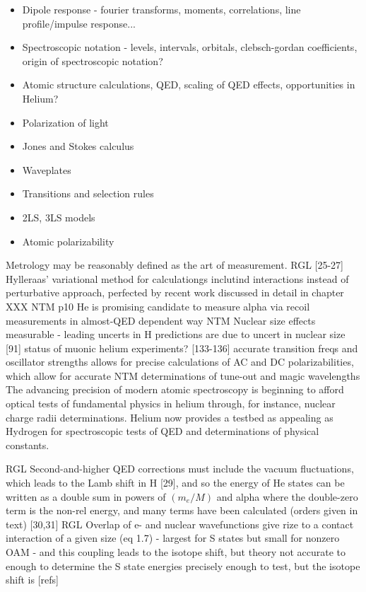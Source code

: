 
\begin{itemize}
	\item Dipole response - fourier transforms, moments, correlations, line profile/impulse response...
	\item Spectroscopic notation - levels, intervals, orbitals, clebsch-gordan coefficients, origin of spectroscopic notation?
	\item Atomic structure calculations, QED, scaling of QED effects, opportunities in Helium?
	\item Polarization of light
	\item Jones and Stokes calculus
	\item Waveplates
	\item Transitions and selection rules
	\item 2LS, 3LS models
	\item Atomic polarizability
\end{itemize}
Metrology may be reasonably defined as the art of measurement.
RGL [25-27] Hylleraas' variational method for calculationgs inclutind interactions instead of perturbative approach, perfected by recent work discussed in detail in chapter XXX
NTM p10 He is promising candidate to measure alpha via recoil measurements in almost-QED dependent way 
NTM Nuclear size effects measurable - leading uncerts in H predictions are due to uncert in nuclear size [91] 
		status of muonic helium experiments?
[133-136] accurate transition freqs and oscillator strengths allows for precise calculations of AC and DC polarizabilities, which allow for accurate NTM determinations of tune-out and magic wavelengths 
The advancing precision of modern atomic spectroscopy is beginning to afford optical tests of fundamental physics in helium through, for instance, nuclear charge radii determinations.
	Helium now provides a testbed as appealing as Hydrogen for spectroscopic tests of QED and determinations of physical constants.
	
			RGL Second-and-higher QED corrections must include the vacuum fluctuations, which leads to the Lamb shift in H [29], and so the energy of He states can be written as a double sum in powers of $(m_e/M)$ and alpha where the double-zero term is the non-rel energy, and many terms have been calculated (orders given in text) [30,31]  
			RGL Overlap of e- and nuclear wavefunctions give rize to a contact interaction of a given size (eq 1.7) - largest for S states but small for nonzero OAM - and this coupling leads to the isotope shift, but theory not accurate to enough to determine the S state energies precisely enough to test, but the isotope shift is [refs] 

